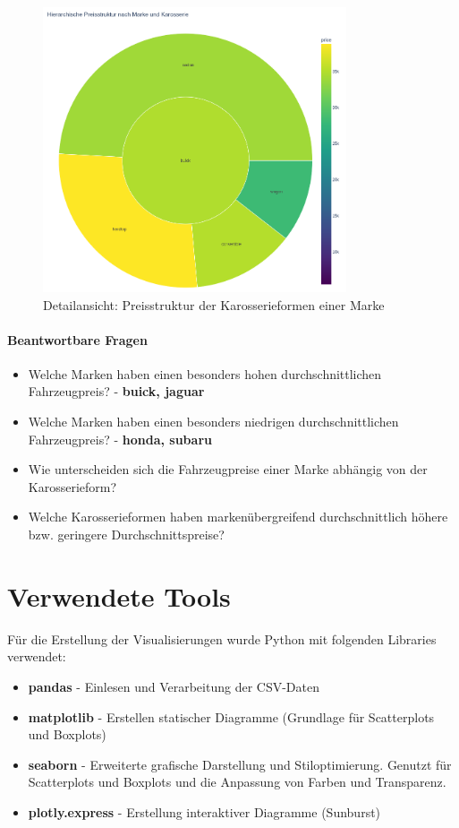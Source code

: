\documentclass[a4paper,12pt]{article}
\begin{document}
\begin{figure}[H]
    \centering
    \includegraphics[width=0.8\textwidth]{../images/preisstruktur_nach_marke_karosserie_clicked.png} %
    \caption{Detailansicht: Preisstruktur der Karosserieformen einer Marke}
    \label{fig:vis4}
  \end{figure}



\hfill \break

\paragraph{Beantwortbare Fragen}
\begin{itemize}
  \item Welche Marken haben einen besonders hohen durchschnittlichen Fahrzeugpreis? - \textbf{buick, jaguar}
  \item Welche Marken haben einen besonders niedrigen durchschnittlichen Fahrzeugpreis? - \textbf{honda, subaru}
  \item Wie unterscheiden sich die Fahrzeugpreise einer Marke abhängig von der Karosserieform?
  \item Welche Karosserieformen haben markenübergreifend durchschnittlich höhere bzw. geringere Durchschnittspreise?
\end{itemize}


\section{Verwendete Tools}
Für die Erstellung der Visualisierungen wurde Python mit folgenden Libraries verwendet:

\begin{itemize}
  \item \textbf{pandas} - Einlesen und Verarbeitung der CSV-Daten
  \item \textbf{matplotlib} - Erstellen statischer Diagramme (Grundlage für Scatterplots und Boxplots) 
  \item \textbf{seaborn} - Erweiterte grafische Darstellung und Stiloptimierung.
    Genutzt für Scatterplots und Boxplots und die Anpassung von Farben und Transparenz.
  \item \textbf{plotly.express} - Erstellung interaktiver Diagramme (Sunburst)
\end{itemize}
\end{document}
